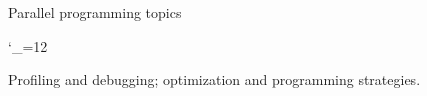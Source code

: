 \documentclass[11pt,headernav]{beamer}
\begin{document}


 {Parallel programming topics}

\begingroup \catcode`\_=12
\let\indexmpishow\texttt

\endgroup

 {Profiling and debugging; optimization and programming strategies.}





\newenvironment{theindex}{\begin{itemize}}{\end{itemize}}
\let\indexspace\par
\def\subitem{\par\indent}

\end{document}
